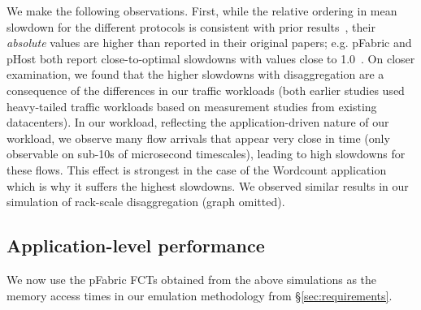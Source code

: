 We make the following observations. 
First, while the relative ordering in mean slowdown for the different protocols is consistent with prior results~\cite{phost}, their \emph{absolute} values are higher than reported 
in their original papers; e.g. pFabric and pHost both report close-to-optimal slowdowns with values close to 1.0~\cite{phost,pfabric}. 
On closer examination, we found that the higher slowdowns with disaggregation are a consequence of the differences in our traffic workloads (both earlier studies used heavy-tailed traffic workloads based on measurement 
studies from existing datacenters). In our \dis workload, reflecting the 
application-driven nature of our workload, we observe many flow arrivals that 
appear very close in time (only observable on sub-10s of microsecond timescales), leading to high slowdowns for these flows. This effect is strongest in the case of the Wordcount application which is why it suffers the highest slowdowns. 
We observed similar results in our simulation of rack-scale disaggregation (graph omitted).
%
%
\subsection{Application-level performance}
\label{ssec:alp}
We now use the pFabric FCTs obtained from the above simulations as the memory access times in our emulation methodology from \S\ref{sec:requirements}. 

